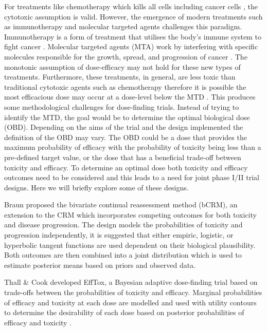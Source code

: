 For treatments like chemotherapy which kills all cells including cancer cells \cite{corrieCytotoxicChemotherapyClinical2008}, the cytotoxic assumption is valid. However, the emergence of modern treatments such as immunotherapy and molecular targeted agents challenges this paradigm. Immunotherapy is a form of treatment that utilises the body's immune system to fight cancer \cite{mellmanCancerImmunotherapyComes2011}. Molecular targeted agents (MTA) work by interfering with specific molecules responsible for the growth, spread, and progression of cancer \cite{soriaAddedValueMolecular2011}. The monotonic assumption of dose-efficacy may not hold for these new types of treatments. Furthermore, these treatments, in general, are less toxic than traditional cytotoxic agents such as chemotherapy therefore it is possible the most efficacious dose may occur at a dose-level below the MTD \cite{ahnOptimalBiologicalDose2016}. This produces some methodological challenges for dose-finding trials. Instead of trying to identify the MTD, the goal would be to determine the optimal biological dose (OBD). Depending on the aims of the trial and the design implemented the definition of the OBD may vary. The OBD could be a dose that provides the maximum probability of efficacy with the probability of toxicity being less than a pre-defined target value, or the dose that has a beneficial trade-off between toxicity and efficacy. To determine an optimal dose both toxicity and efficacy outcomes need to be considered and this leads to a need for joint phase \RN{1}/\RN{2} trial designs. Here we will briefly explore some of these designs. 

Braun \cite{braunBivariateContinualReassessment2002} proposed the bivariate continual reassessment method (bCRM), an extension to the CRM which incorporates competing outcomes for both toxicity and disease progression. The design models the probabilities of toxicity and progression independently, it is suggested that either empiric, logistic, or hyperbolic tangent functions are used dependent on their biological plausibility. Both outcomes are then combined into a joint distribution which is used to estimate posterior means based on priors and observed data. 

Thall \& Cook \cite{thallDosefindingBasedEfficacytoxicity2004} developed EffTox, a Bayesian adaptive dose-finding trial based on trade-offs between the probabilities of toxicity and efficacy. Marginal probabilities of efficacy and toxicity at each dose are modelled and used with utility contours to determine the desirability of each dose based on posterior probabilities of efficacy and toxicity \cite{brockImplementingEffToxDosefinding2017}. 


